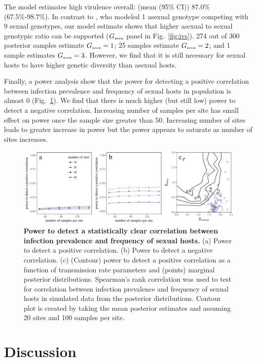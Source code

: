 \documentclass{article}\usepackage[]{graphicx}\usepackage[]{color}
\newcommand{\fref}[1]{Fig.~\ref{fig:#1}}
\begin{document}
The model estimates high virulence overall: (mean (95\% CI)) 87.0\% (67.5\%-98.7\%).
In contrast to \cite{lively2010epidemiological}, who modeled 1 asexual genotype competing with 9 sexual genotypes, our model estimate shows that higher asexual to sexual genotypic ratio can be supported ($G_{\textrm{\tiny asex}}$ panel in \fref{ivs}).
274 out of 300 posterior samples estimate $G_{\textrm{\tiny asex}} = 1$; 25 samples estimate $G_{\textrm{\tiny asex}} = 2$; and 1 sample estimates $G_{\textrm{\tiny asex}} = 3$.
However, we find that it is still necessary for sexual hosts to have higher genetic diversity than asexual hosts.

Finally, a power analysis show that the power for detecting a positive correlation between infection prevalence and frequency of sexual hosts in \cite{vergara2014infection} population is almost 0 (\fref{power}).
We find that there is much higher (but still low) power to detect a negative correlation.
Increasing number of samples per site has small effect on power once the sample size greater than 50.
Increasing number of sites leads to greater increase in power but the power appears to saturate as number of sites increases.

\begin{figure}[!ht]
\includegraphics[width=\textwidth]{../fig/power.pdf}
\caption{{\bf Power to detect a statistically clear correlation between infection prevalence and frequency of sexual hosts.}
(a) Power to detect a positive correlation. 
(b) Power to detect a negative correlation. 
(c) (Contour) power to detect a positive correlation as a function of transmission rate parameters and (points) marginal posterior distributions.
Spearman's rank correlation was used to test for correlation between infection prevalence and frequency of sexual hosts in simulated data from the posterior distributions.
Contour plot is created by taking the mean posterior estimates and assuming 20 sites and 100 samples per site.
}
\label{fig:power}
\end{figure}

\section{Discussion}
\end{document}

